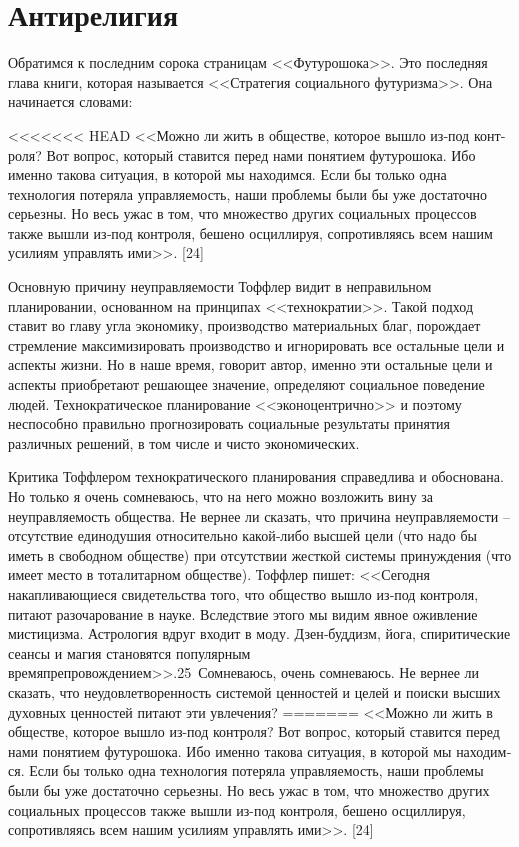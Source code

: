 \documentclass{book}
\begin{document}
{\section{Антирелигия}

Обратимся к последним сорока страницам <<Футурошока>>. Это последняя глава книги, которая называется <<Стратегия со­циального футуризма>>. Она начинается словами:

<<<<<<< HEAD
<<Можно ли жить в обществе, которое вышло из‑под конт­роля? Вот вопрос, который ставится перед нами понятием футурошока. Ибо именно такова ситуация, в которой мы находим­ся. Если бы только одна технология потеряла управляемость, наши проблемы были бы уже достаточно серьезны. Но весь ужас в том, что множество других социальных процессов также вышли из‑под контроля, бешено осциллируя, сопротивляясь всем нашим усилиям управлять ими>>. [24]

Основную причину неуправляемости Тоффлер видит в непра­вильном планировании, основанном на принципах <<технократии>>. Такой подход ставит во главу угла экономику, произ­водство материальных благ, порождает стремление максимизи­ровать производство и игнорировать все остальные цели и ас­пекты жизни. Но в наше время, говорит автор, именно эти остальные цели и аспекты приобретают решающее значение, опре­деляют социальное поведение людей. Технократическое плани­рование <<эконоцентрично>> и поэтому неспособно правильно прогнозировать социальные результаты принятия различных ре­шений, в том числе и чисто экономических.

Критика Тоффлером технократического планирования спра­ведлива и обоснована. Но только я очень сомневаюсь, что на не­го можно возложить вину за неуправляемость общества. Не вер­нее ли сказать, что причина неуправляемости -- отсутствие еди­нодушия относительно какой‑либо высшей цели (что надо бы иметь в свободном обществе) при отсутствии жесткой систе­мы принуждения (что имеет место в тоталитарном обществе). Тоффлер пишет: <<Сегодня накапливающиеся свидетельства того, что общество вышло из‑под контроля, питают разочаро­вание в науке. Вследствие этого мы видим явное оживление мистицизма. Астрология вдруг входит в моду. Дзен‑буддизм, йога, спиритические сеансы и магия становятся популярным времяпрепровождением>>.25 Сомневаюсь, очень сомневаюсь. Не вернее ли сказать, что неудовлетворенность системой ценно­стей и целей и поиски высших духовных ценностей питают эти увлечения?
=======
<<Можно ли жить в обществе, которое вышло из-под конт­роля? Вот вопрос, который ставится перед нами понятием футурошока. Ибо именно такова ситуация, в которой мы находим­ся. Если бы только одна технология потеряла управляемость, наши проблемы были бы уже достаточно серьезны. Но весь ужас в том, что множество других социальных процессов также вышли из-под контроля, бешено осциллируя, сопротивляясь всем нашим усилиям управлять ими>>. [24]

}
\end{document}
